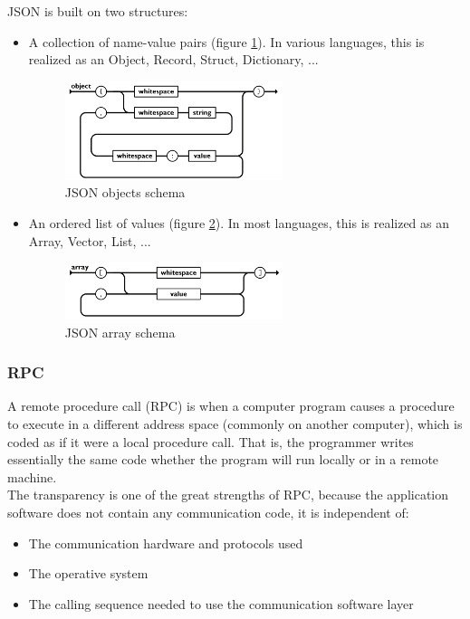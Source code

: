 \documentclass[a4paper, 12pt]{article} %
\begin{document}
            JSON is built on two structures\cite{jsonSchema}:
            \begin{itemize}
                \item A collection of name-value pairs (figure \ref{fig:json_objects}). In various languages, this is realized as an Object, Record, Struct, Dictionary, ...
                \begin{figure}[h]
                    \centering
                    \includegraphics[width=0.6\textwidth]{json-objects.png}
                    \caption{JSON objects schema}
                    \label{fig:json_objects}
                \end{figure}
                \item An ordered list of values (figure \ref{fig:json_arrays}). In most languages, this is realized as an Array, Vector, List, ...
                \begin{figure}[h]
                    \centering
                    \includegraphics[width=0.6\textwidth]{json-arrays.png}
                    \caption{JSON array schema}
                    \label{fig:json_arrays}
                \end{figure}
            \end{itemize}

        \subsubsection{RPC}
            A remote procedure call (RPC)\cite{rpc} is when a computer program causes a procedure to execute in a different address space (commonly on another computer), which is coded as if it were a local procedure call. That is, the programmer writes essentially the same code whether the program will run locally or in a remote machine.\\
            
            The transparency is one of the great strengths of RPC, because the application software does not contain any communication code, it is independent of:
            \begin{itemize}
                \item The communication hardware and protocols used
                \item The operative system
                \item The calling sequence needed to use the communication software layer
            \end{itemize}
            
\end{document}
